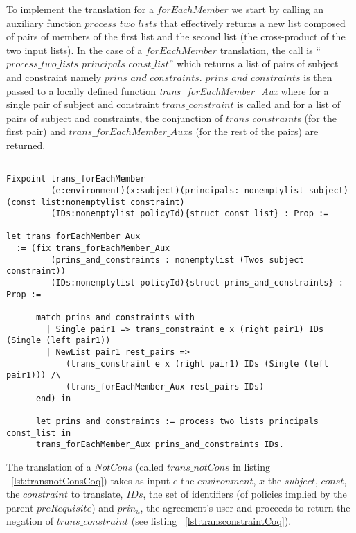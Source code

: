 To implement the translation for a $forEachMember$ we start by calling an auxiliary function $process\_two\_lists$ that effectively returns a new list composed of pairs of members of the first list and the second list (the cross-product of the two input lists). In the case of a $forEachMember$ translation, the call is ``$process\_two\_lists$ $principals$ $const\_list$'' which returns a list of pairs of subject and constraint namely $prins\_and\_constraints$. $prins\_and\_constraints$ is then passed to a locally defined function \emph{ trans_forEachMember_Aux} where for a single pair of subject and constraint $trans\_constraint$ is called and for a list of pairs of subject and constraints, the conjunction of $trans\_constraint$s (for the first pair) and $trans\_forEachMember\_Aux$s (for the rest of the pairs) are returned.



\begin{minipage}[c]{0.95\textwidth}
\begin{lstlisting}

Fixpoint trans_forEachMember
         (e:environment)(x:subject)(principals: nonemptylist subject)(const_list:nonemptylist constraint)
         (IDs:nonemptylist policyId){struct const_list} : Prop := 

let trans_forEachMember_Aux   
  := (fix trans_forEachMember_Aux
         (prins_and_constraints : nonemptylist (Twos subject constraint))
         (IDs:nonemptylist policyId){struct prins_and_constraints} : Prop :=

      match prins_and_constraints with
        | Single pair1 => trans_constraint e x (right pair1) IDs (Single (left pair1)) 
        | NewList pair1 rest_pairs =>
            (trans_constraint e x (right pair1) IDs (Single (left pair1))) /\
            (trans_forEachMember_Aux rest_pairs IDs)
      end) in

      let prins_and_constraints := process_two_lists principals const_list in
      trans_forEachMember_Aux prins_and_constraints IDs.

\end{lstlisting}
\end{minipage}

The translation of a $NotCons$ (called $trans\_notCons$ in listing ~\ref{lst:transnotConsCoq}) takes as input $e$ the $environment$, $x$ the $subject$, $const$, the $constraint$ to translate, $IDs$, the set of identifiers (of policies implied by the parent $preRequisite$) and $prin_{u}$, the agreement's user and proceeds to return the negation of $trans\_constraint$ (see listing ~\ref{lst:transconstraintCoq}).


